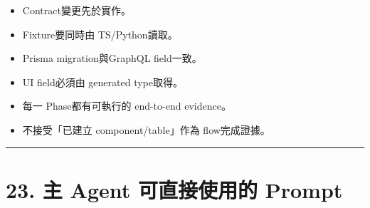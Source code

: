 \documentclass[
  9pt,
  a4paper,
]{article}
\providecommand{\tightlist}{%
  \setlength{\itemsep}{0pt}\setlength{\parskip}{0pt}}
\begin{document}
\begin{itemize}
\tightlist
\item
  Contract變更先於實作。
\item
  Fixture要同時由 TS/Python讀取。
\item
  Prisma migration與GraphQL field一致。
\item
  UI field必須由 generated type取得。
\item
  每一 Phase都有可執行的 end-to-end evidence。
\item
  不接受「已建立 component/table」作為 flow完成證據。
\end{itemize}

\begin{center}\rule{0.5\linewidth}{0.5pt}\end{center}

\section{23. 主 Agent 可直接使用的
Prompt}\label{23-ux4e3b-agent-ux53efux76f4ux63a5ux4f7fux7528ux7684-prompt}
\end{document}

